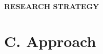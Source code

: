 \documentclass[11pt,letterpaper]{article}
\begin{document}
\textbf{RESEARCH STRATEGY}
\vspace{-4pt}

\renewcommand{\printbibliography}[1][]{}
\def\nobib{1}





\section{C. Approach}







% 


\end{document}
